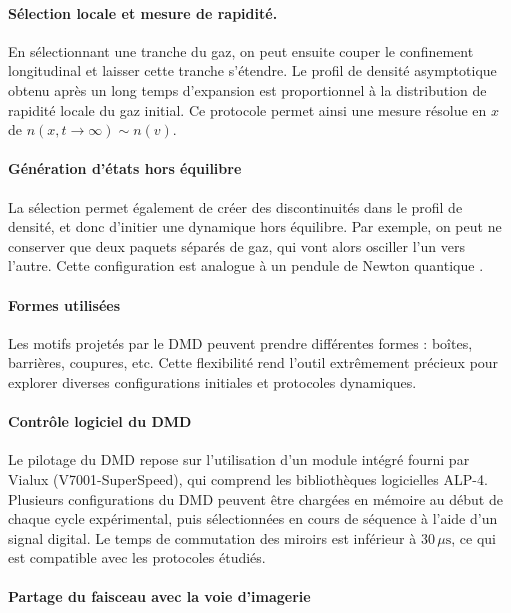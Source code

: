 \paragraph{Sélection locale et mesure de rapidité.}

En sélectionnant une tranche du gaz, on peut ensuite couper le confinement longitudinal et laisser cette tranche s’étendre. Le profil de densité asymptotique obtenu après un long temps d’expansion est proportionnel à la distribution de rapidité locale du gaz initial. Ce protocole permet ainsi une mesure résolue en $x$ de \(n(x,t \to \infty) \sim n(v)\).

\paragraph{Génération d’états hors équilibre}

La sélection permet également de créer des discontinuités dans le profil de densité, et donc d’initier une dynamique hors équilibre. Par exemple, on peut ne conserver que deux paquets séparés de gaz, qui vont alors osciller l’un vers l’autre. Cette configuration est analogue à un pendule de Newton quantique \cite{10.21468/SciPostPhys.6.6.070,Kinoshita}.

\paragraph{Formes utilisées}

Les motifs projetés par le \gls*{DMD} peuvent prendre différentes formes : boîtes, barrières, coupures, etc. Cette flexibilité rend l’outil extrêmement précieux pour explorer diverses configurations initiales et protocoles dynamiques.

\paragraph{Contrôle logiciel du DMD}

Le pilotage du \gls*{DMD} repose sur l’utilisation d’un module intégré fourni par Vialux (V7001-SuperSpeed), qui comprend les bibliothèques logicielles ALP-4. Plusieurs configurations du DMD peuvent être chargées en mémoire au début de chaque cycle expérimental, puis sélectionnées en cours de séquence à l’aide d’un signal digital. Le temps de commutation des miroirs est inférieur à \(30\,\mu\mathrm{s}\), ce qui est compatible avec les protocoles étudiés.

\paragraph{Partage du faisceau avec la voie d’imagerie}

